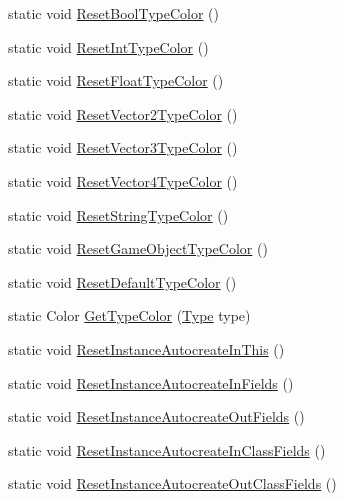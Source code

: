 \begin{DoxyCompactItemize}
static void \hyperlink{classi_c_s___preferences_controller_a8305f529c3a67001dc488d8075f1aefa}{Reset\+Bool\+Type\+Color} ()
\item 
static void \hyperlink{classi_c_s___preferences_controller_a218c98a3bc2d7bb31a4999750b3df524}{Reset\+Int\+Type\+Color} ()
\item 
static void \hyperlink{classi_c_s___preferences_controller_a657a25e63f332e002e09661700e67c61}{Reset\+Float\+Type\+Color} ()
\item 
static void \hyperlink{classi_c_s___preferences_controller_ad015392d05a61bb2e6787a3df4107d96}{Reset\+Vector2\+Type\+Color} ()
\item 
static void \hyperlink{classi_c_s___preferences_controller_a12f789b4cc56d320212e651c739eeb63}{Reset\+Vector3\+Type\+Color} ()
\item 
static void \hyperlink{classi_c_s___preferences_controller_ae243c17ad352235d600e0efb4f832757}{Reset\+Vector4\+Type\+Color} ()
\item 
static void \hyperlink{classi_c_s___preferences_controller_a2b033d4bd71892cfbb0c856df1aeaee7}{Reset\+String\+Type\+Color} ()
\item 
static void \hyperlink{classi_c_s___preferences_controller_a857e265b4dbe0367ba66f5f874969bec}{Reset\+Game\+Object\+Type\+Color} ()
\item 
static void \hyperlink{classi_c_s___preferences_controller_a15b0e1fcf04918e7ccfadd8da62fd382}{Reset\+Default\+Type\+Color} ()
\item 
static Color \hyperlink{classi_c_s___preferences_controller_a09dbfa6f5e167a544a9f0c76360418e8}{Get\+Type\+Color} (\hyperlink{i_c_s___object_type_enum_8cs_ae6c3dd6d8597380b56d94908eb431547aa1fa27779242b4902f7ae3bdd5c6d508}{Type} type)
\item 
static void \hyperlink{classi_c_s___preferences_controller_a67d7a05e13f961d367e234cf627caea9}{Reset\+Instance\+Autocreate\+In\+This} ()
\item 
static void \hyperlink{classi_c_s___preferences_controller_a7248d18e07a39291dad9f699e143f479}{Reset\+Instance\+Autocreate\+In\+Fields} ()
\item 
static void \hyperlink{classi_c_s___preferences_controller_a2ef8fbe70e9a6e741d7c331463974d15}{Reset\+Instance\+Autocreate\+Out\+Fields} ()
\item 
static void \hyperlink{classi_c_s___preferences_controller_a026e41790e22ae003368c4f0fa485bcb}{Reset\+Instance\+Autocreate\+In\+Class\+Fields} ()
\item 
static void \hyperlink{classi_c_s___preferences_controller_abde07cabb7d61f4b1d2ca449b9fba032}{Reset\+Instance\+Autocreate\+Out\+Class\+Fields} ()

\end{DoxyCompactItemize}
